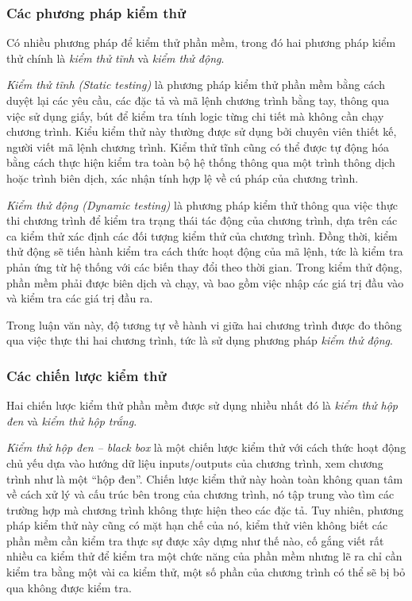 \subsubsection*{Các phương pháp kiểm thử}

Có nhiều phương pháp để kiểm thử phần mềm, trong đó hai phương pháp
kiểm thử chính là \emph{kiểm thử tĩnh} và \emph{kiểm thử động}.

\emph{Kiểm thử tĩnh (Static testing)} là phương pháp kiểm thử phần mềm
bằng cách duyệt lại các yêu cầu, các đặc tả và mã lệnh chương trình
bằng tay, thông qua việc sử dụng giấy, bút để kiểm tra tính logic từng
chi tiết mà không cần chạy chương trình. Kiểu kiểm thử này thường được
sử dụng bởi chuyên viên thiết kế, người viết mã lệnh chương
trình. Kiểm thử tĩnh cũng có thể được tự động hóa bằng cách thực hiện
kiểm tra toàn bộ hệ thống thông qua một trình thông dịch hoặc trình
biên dịch, xác nhận tính hợp lệ về cú pháp của chương trình.
		
\emph{Kiểm thử động (Dynamic testing)} là phương pháp kiểm thử thông
qua việc thực thi chương trình để kiểm tra trạng thái tác động của
chương trình, dựa trên các ca kiểm thử xác định các đối tượng kiểm thử
của chương trình. Đồng thời, kiểm thử động sẽ tiến hành kiểm tra cách
thức hoạt động của mã lệnh, tức là kiểm tra phản ứng từ hệ thống với
các biến thay đổi theo thời gian. Trong kiểm thử động, phần mềm phải
được biên dịch và chạy, và bao gồm việc nhập các giá trị đầu vào và
kiểm tra các giá trị đầu ra.

Trong luận văn này, độ tương tự về hành vi giữa hai chương trình được
đo thông qua việc thực thi hai chương trình, tức là sử dụng phương
pháp \emph{kiểm thử động}.
	
\subsubsection*{Các chiến lược kiểm thử}

Hai chiến lược kiểm thử phần mềm được sử dụng nhiều nhất đó là 
\emph{kiểm thử hộp đen} và \emph{kiểm thử hộp trắng}.
	
\emph{Kiểm thử hộp đen – black box} là một chiến lược kiểm thử với
cách thức hoạt động chủ yếu dựa vào hướng dữ liệu inputs/outputs của
chương trình, xem chương trình như là một ``hộp đen''. Chiến lược kiểm
thử này hoàn toàn không quan tâm về cách xử lý và cấu trúc bên trong
của chương trình, nó tập trung vào tìm các trường hợp mà chương trình
không thực hiện theo các đặc tả. Tuy nhiên, phương pháp kiểm thử này
cũng có mặt hạn chế của nó, kiểm thử viên không biết các phần mềm cần
kiểm tra thực sự được xây dựng như thế nào, cố gắng viết rất nhiều ca
kiểm thử để kiểm tra một chức năng của phần mềm nhưng lẽ ra chỉ cần
kiểm tra bằng một vài ca kiểm thử, một số phần của chương trình
có thể sẽ bị bỏ qua không được kiểm tra.

